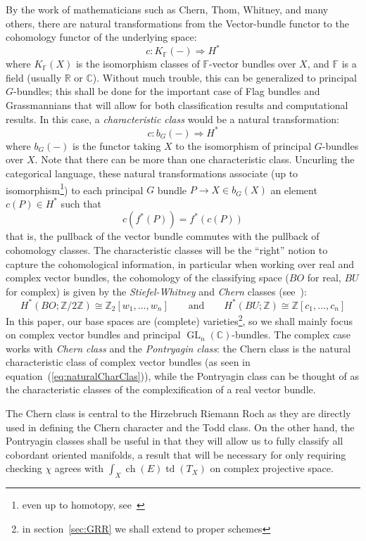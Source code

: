 \documentclass{book}
\newcommand{\F}{{\mathbb{F}}}
\newcommand{\R}{{\mathbb{R}}}
\newcommand{\Z}{{\mathbb{Z}}}
\newcommand{\C}{{\mathbb{C}}}
\newcommand{\ch}{{\operatorname{ch}}}
\newcommand{\GL}{{\operatorname{GL}}}
\newcommand{\Rw}{\Rightarrow}
\newcommand{\td}{{\operatorname{td}}}
\renewcommand{\ch}{{\operatorname{ch}}}
\begin{document}
By the work of mathematicians such as Chern, Thom, Whitney, and many others, there are natural transformations
from the Vector-bundle functor to the cohomology functor of the underlying space:
\[
  c: K_\F(-) \Rw H^*
\]
where $K_\F(X)$ is the isomorphism classes of $\F$-vector bundles over $X$, and $\F$ is a field (usually $\R$
or $\C$). Without much trouble, this can be generalized to principal $G$-bundles; this shall be done for the
important case of Flag bundles and Grassmannians that will allow for both classification results and
computational results. In this case, a \emph{characteristic class} would be a natural transformation:
\[
  c: b_G(-) \Rw H^*
\]
where $b_G(-)$ is the functor taking $X$ to the isomorphism of principal $G$-bundles over $X$. Note that there
can be more than one characteristic class. Uncurling the categorical language, these natural
transformations associate (up to isomorphism\footnote{even up to homotopy, see~\cite{NateKTheory}}) to each principal $G$ bundle $P \to X\in b_G(X)$ an element $c(P) \in H^*$ such
that
\[
  c(f^*(P)) = f^*(c(P))
\]
that is, the pullback of the vector bundle commutes with the pullback of
cohomology classes. The characteristic classes will be the ``right'' notion to capture the cohomological
information, in particular when working over real and complex vector bundles, the cohomology
of the classifying space ($BO$ for real, $BU$ for complex) is given by the \emph{Stiefel-Whitney} and \emph{Chern} classes
(see~\cite{NateKTheory}):
\begin{equation}\label{eq:naturalCharClas}
  H^*(BO; \Z/2\Z) \cong \Z_2[w_1, ..., w_n] \qquad \text{and} \qquad  H^*(BU; \Z)
  \cong \Z[c_1, ..., c_n]
\end{equation}
In this paper, our base spaces are (complete) varieties\footnote{in section~\ref{sec:GRR} we shall extend to
proper schemes}, so we shall mainly focus on complex vector bundles and principal
$\GL_n(\C)$-bundles. The complex case works with \emph{Chern class} and the \emph{Pontryagin class}: the Chern class
is the natural characteristic class of complex vector bundles (as seen in
equation~(\ref{eq:naturalCharClas})), while the Pontryagin class can be thought of as the characteristic
classes of the complexification of a real vector bundle.

The Chern class is central to the Hirzebruch Riemann Roch as they are directly used in defining the Chern
character and the Todd class. On the other hand, the Pontryagin classes shall be useful in that they will
allow us to fully classify all cobordant oriented manifolds, a result that will be necessary for only requiring checking
$\chi$ agrees with $\int_X \ch(E)\td(T_X)$ on complex projective space.
\end{document}
